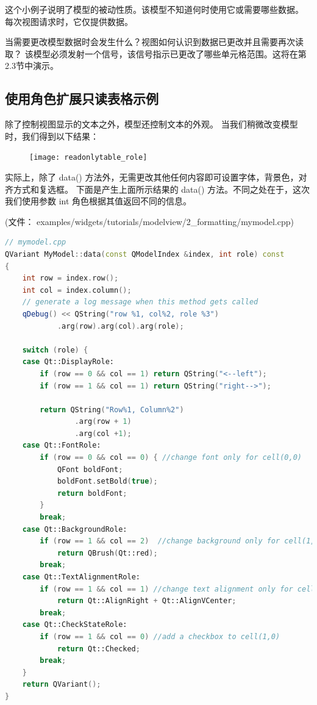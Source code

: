 这个小例子说明了模型的被动性质。该模型不知道何时使用它或需要哪些数据。
每次视图请求时，它仅提供数据。

当需要更改模型数据时会发生什么？视图如何认识到数据已更改并且需要再次读取？
该模型必须发射一个信号，该信号指示已更改了哪些单元格范围。这将在第2.3节中演示。

\subsection{使用角色扩展只读表格示例}

除了控制视图显示的文本之外，模型还控制文本的外观。
当我们稍微改变模型时，我们得到以下结果：

\begin{figure}[hbt!]  
\texttt{[image: readonlytable\_role]}
\end{figure}

实际上，除了 data() 方法外，无需更改其他任何内容即可设置字体，背景色，对齐方式和复选框。
下面是产生上面所示结果的 data() 方法。不同之处在于，这次我们使用参数 int 角色根据其值返回不同的信息。

(文件： examples/widgets/tutorials/modelview/2\_formatting/mymodel.cpp)

\begin{lstlisting}[language=C++]
// mymodel.cpp
QVariant MyModel::data(const QModelIndex &index, int role) const
{
    int row = index.row();
    int col = index.column();
    // generate a log message when this method gets called
    qDebug() << QString("row %1, col%2, role %3")
            .arg(row).arg(col).arg(role);

    switch (role) {
    case Qt::DisplayRole:
        if (row == 0 && col == 1) return QString("<--left");
        if (row == 1 && col == 1) return QString("right-->");

        return QString("Row%1, Column%2")
                .arg(row + 1)
                .arg(col +1);
    case Qt::FontRole:
        if (row == 0 && col == 0) { //change font only for cell(0,0)
            QFont boldFont;
            boldFont.setBold(true);
            return boldFont;
        }
        break;
    case Qt::BackgroundRole:
        if (row == 1 && col == 2)  //change background only for cell(1,2)
            return QBrush(Qt::red);
        break;
    case Qt::TextAlignmentRole:
        if (row == 1 && col == 1) //change text alignment only for cell(1,1)
            return Qt::AlignRight + Qt::AlignVCenter;
        break;
    case Qt::CheckStateRole:
        if (row == 1 && col == 0) //add a checkbox to cell(1,0)
            return Qt::Checked;
        break;
    }
    return QVariant();
}
\end{lstlisting}

